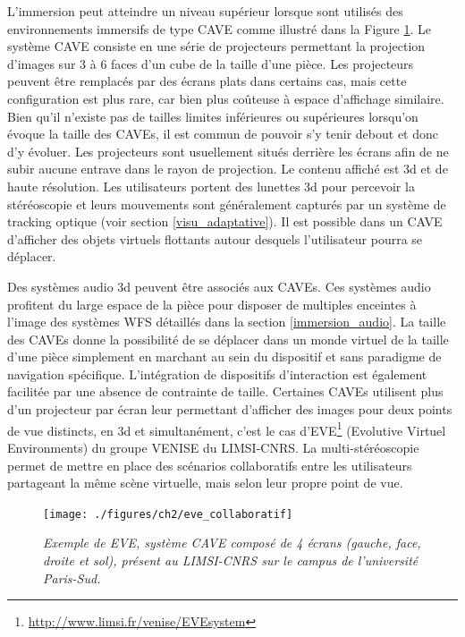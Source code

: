 L'immersion peut atteindre un niveau supérieur lorsque sont utilisés des environnements immersifs de type CAVE \cite{cruz-neira_cave:_1992} comme illustré dans la Figure \ref{Fig:eve_collaboratif}. Le système CAVE consiste en une série de projecteurs permettant la projection d'images sur 3 à 6 faces d'un cube de la taille d'une pièce. Les projecteurs peuvent être remplacés par des écrans plats dans certains cas, mais cette configuration est plus rare, car bien plus coûteuse à espace d'affichage similaire. Bien qu'il n'existe pas de tailles limites inférieures ou supérieures lorsqu'on évoque la taille des CAVEs, il est commun de pouvoir s'y tenir debout et donc d'y évoluer. Les projecteurs sont usuellement situés derrière les écrans afin de ne subir aucune entrave dans le rayon de projection. Le contenu affiché est 3d et de haute résolution. Les utilisateurs portent des lunettes 3d pour percevoir la stéréoscopie et leurs mouvements sont généralement capturés par un système de tracking optique (voir section \ref{visu_adaptative}). Il est possible dans un CAVE d'afficher des objets virtuels flottants autour desquels l'utilisateur pourra se déplacer.

Des systèmes audio 3d peuvent être associés aux CAVEs. Ces systèmes audio profitent du large espace de la pièce pour disposer de multiples enceintes à l'image des systèmes WFS détaillés dans la section \ref{immersion_audio}.
La taille des CAVEs donne la possibilité de se déplacer dans un monde virtuel de la taille d'une pièce simplement en marchant au sein du dispositif et sans paradigme de navigation spécifique. L'intégration de dispositifs d'interaction est également facilitée par une absence de contrainte de taille. 
Certaines CAVEs utilisent plus d'un projecteur par écran leur permettant d'afficher des images pour deux points de vue distincts, en 3d et simultanément, c'est le cas d'EVE\footnote{\url{http://www.limsi.fr/venise/EVEsystem}} (Evolutive Virtuel Environments) du groupe VENISE du LIMSI-CNRS. La multi-stéréoscopie permet de mettre en place des scénarios collaboratifs entre les utilisateurs partageant la même scène virtuelle, mais selon leur propre point de vue.

\begin{figure}
  \centering
  {\texttt{[image: ./figures/ch2/eve\_collaboratif]}}
    \caption[Système CAVE, EVE du LIMSI-CNRS.]{{\it Exemple de EVE, système CAVE composé de 4 écrans (gauche, face, droite et sol), présent au LIMSI-CNRS sur le campus de l'université Paris-Sud.}}
  \label{Fig:eve_collaboratif}
  \hspace{0.3cm}
\end{figure}

